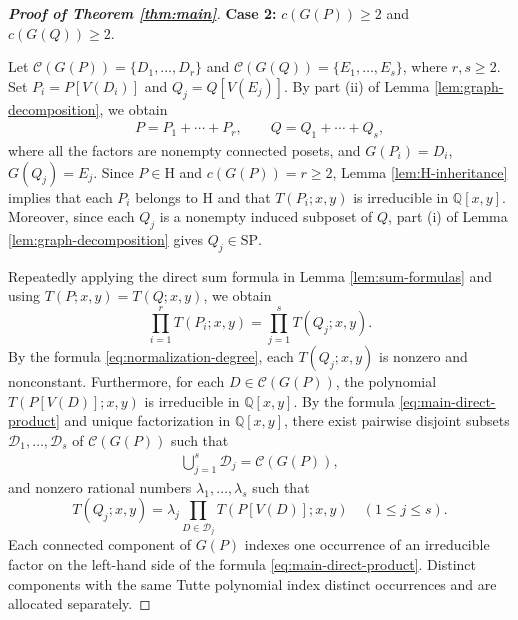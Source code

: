\documentclass[10pt,a4paper]{amsart}
\begin{document}
\begin{proof}[\rm\textbf{Proof of Theorem \ref{thm:main}}]
\textbf{Case 2:} $c(G(P))\geq2$ and $c(G(Q))\geq2$.

Let $\mathcal C(G(P))=\{D_1,\ldots,D_r\}$ and $\mathcal C(G(Q))=\{E_1,\ldots,E_s\}$, where $r,s\geq2$.
Set $P_i=P[V(D_i)]$ and $Q_j=Q[V(E_j)]$.
By part \textup{(ii)} of Lemma \ref{lem:graph-decomposition}, we obtain
\begin{eqnarray*}
P=P_1+\cdots+P_r,\qquad Q=Q_1+\cdots+Q_s,
\end{eqnarray*}
where all the factors are nonempty connected posets,
and $G(P_i)=D_i$, $G(Q_j)=E_j$.
Since $P\in\mathrm H$ and $c(G(P))=r\geq2$,
Lemma \ref{lem:H-inheritance} implies that each $P_i$ belongs to $\mathrm H$ and that $T(P_i;x,y)$
is irreducible in $\mathbb Q[x,y]$.
Moreover, since each $Q_j$ is a nonempty induced subposet of $Q$,
part \textup{(i)} of Lemma \ref{lem:graph-decomposition} gives $Q_j\in\mathrm{SP}$.

Repeatedly applying the direct sum formula in Lemma \ref{lem:sum-formulas}
and using $T(P;x,y)=T(Q;x,y)$, we obtain
\begin{equation}\label{eq:main-direct-product}
\prod_{i=1}^{r}T(P_i;x,y)=\prod_{j=1}^{s}T(Q_j;x,y).
\end{equation}
By the formula \eqref{eq:normalization-degree}, each $T(Q_j;x,y)$ is nonzero and nonconstant.
Furthermore, for each $D\in\mathcal C(G(P))$, the polynomial $T(P[V(D)];x,y)$ is irreducible in $\mathbb Q[x,y]$.
By the formula \eqref{eq:main-direct-product} and unique factorization in $\mathbb Q[x,y]$, there exist pairwise disjoint subsets
$\mathcal D_1,\ldots,\mathcal D_s$ of $\mathcal C(G(P))$ such that
\begin{eqnarray*}
\bigcup_{j=1}^{s}\mathcal D_j=\mathcal C(G(P)),
\end{eqnarray*}
and nonzero rational numbers $\lambda_1,\ldots,\lambda_s$ such that
\begin{equation}\label{eq:main-factor-allocation}
T(Q_j;x,y)=\lambda_j\prod_{D\in\mathcal D_j}T(P[V(D)];x,y)\quad(1\leq j\leq s).
\end{equation}
Each connected component of $G(P)$ indexes one occurrence
of an irreducible factor on the left-hand side of the formula \eqref{eq:main-direct-product}.
Distinct components with the same Tutte polynomial index distinct occurrences and are allocated separately.


\end{proof}
\end{document}
